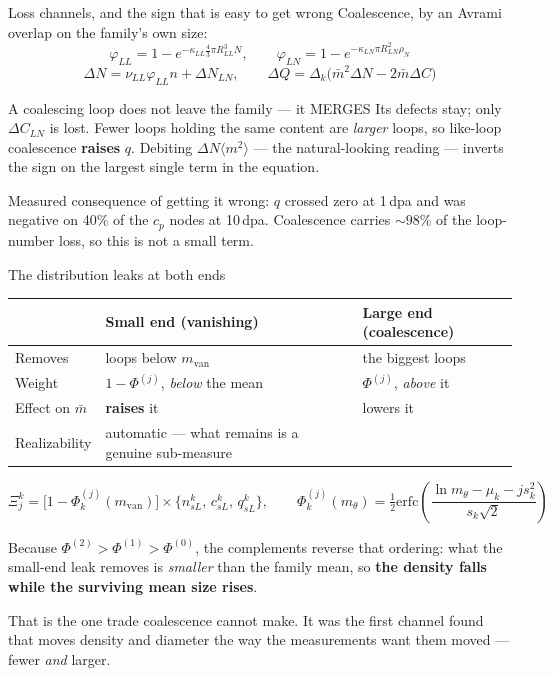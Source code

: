 \documentclass[aspectratio=169,10pt]{beamer}
\newcommand{\foot}[1]{\par\vspace{1ex}%
  \begingroup\footnotesize\raggedright #1\par\endgroup}
\begin{document}
\begin{frame}{Loss channels, and the sign that is easy to get wrong}
\small
Coalescence, by an Avrami overlap on the family's own size:
\[
  \varphi_{LL}=1-e^{-\kappa_{LL}\frac43\pi R^3_{LL}N},\qquad
  \varphi_{LN}=1-e^{-\kappa_{LN}\pi R^2_{LN}\rho_N}
\]
\[
  \Delta N=\nu_{LL}\varphi_{LL}n+\Delta N_{LN},\qquad
  \Delta Q=\Delta_k\bigl(\bar m^{2}\Delta N-2\bar m\Delta C\bigr)
\]
\begin{block}{A coalescing loop does not leave the family --- it MERGES}
Its defects stay; only $\Delta C_{LN}$ is lost. Fewer loops holding the same
content are \emph{larger} loops, so like-loop coalescence \textbf{raises} $q$.
Debiting $\Delta N\langle m^2\rangle$ --- the natural-looking reading ---
inverts the sign on the largest single term in the equation.
\end{block}
\foot{Measured consequence of getting it wrong: $q$ crossed zero at 1\,dpa and
was negative on 40\% of the $c_p$ nodes at 10\,dpa. Coalescence carries
$\sim98\%$ of the loop-number loss, so this is not a small term.}
\end{frame}

\begin{frame}{The distribution leaks at both ends}
\small
\begin{center}
\begin{tabular}{@{}lll@{}}
\toprule
 & \textbf{Small end} (vanishing) & \textbf{Large end} (coalescence) \\
\midrule
Removes & loops below $m_{\mathrm{van}}$ & the biggest loops \\
Weight & $1-\Phi^{(j)}$, \emph{below} the mean & $\Phi^{(j)}$, \emph{above} it \\
Effect on $\bar m$ & \textbf{raises} it & lowers it \\
Realizability & automatic --- what remains is a genuine sub-measure \\
\bottomrule
\end{tabular}
\end{center}
\[
  \Xi^k_j=\bigl[1-\Phi^{(j)}_k(m_{\mathrm{van}})\bigr]\times
  \{n^k_{sL},\,c^k_{sL},\,q^k_{sL}\},\qquad
  \Phi^{(j)}_k(m_\theta)=\tfrac12\mathrm{erfc}\!\left(
    \frac{\ln m_\theta-\mu_k-js_k^{2}}{s_k\sqrt2}\right)
\]
\begin{block}{}
Because $\Phi^{(2)}>\Phi^{(1)}>\Phi^{(0)}$, the complements reverse that
ordering: what the small-end leak removes is \emph{smaller} than the family
mean, so \textbf{the density falls while the surviving mean size rises}.
\end{block}
\foot{That is the one trade coalescence cannot make. It was the first channel
found that moves density and diameter the way the measurements want them
moved --- fewer \emph{and} larger.}
\end{frame}
\end{document}
